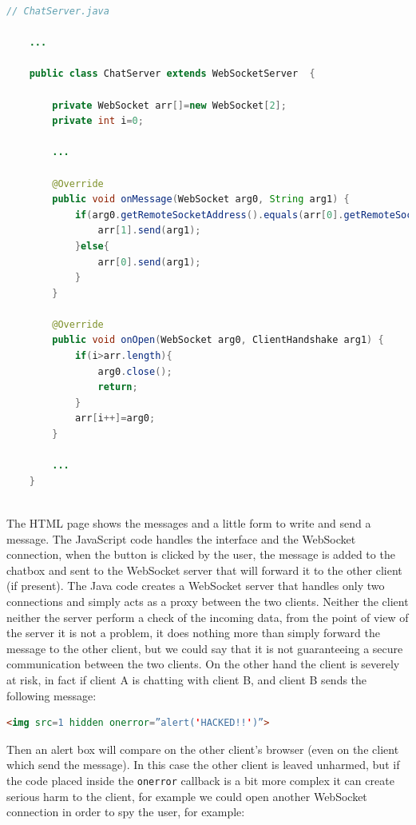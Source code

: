	\begin{lstlisting}[language=Java]
	// ChatServer.java
	
	...
	
	public class ChatServer extends WebSocketServer  {
	
		private WebSocket arr[]=new WebSocket[2];
		private int i=0;
		
		...
		
		@Override
		public void onMessage(WebSocket arg0, String arg1) {
			if(arg0.getRemoteSocketAddress().equals(arr[0].getRemoteSocketAddress())){
				arr[1].send(arg1);
			}else{
				arr[0].send(arg1);
			}
		}
		
		@Override
		public void onOpen(WebSocket arg0, ClientHandshake arg1) {
			if(i>arr.length){
				arg0.close();
				return;
			}
			arr[i++]=arg0;
		}
		
		...
	}
	
	\end{lstlisting}
	
	The HTML page shows the messages and a little form to write and send a message.\newline
	The JavaScript code handles the interface and the WebSocket connection, when the button is clicked by the user, the message is added to the chatbox and sent to the WebSocket server that will forward it to the other client (if present).\newline
	The Java code creates a WebSocket server that handles only two connections and simply acts as a proxy between the two clients.\newline
	Neither the client neither the server perform a check of the incoming data, from the point of view of the server it is not a problem, it does nothing more than simply forward the message to the other client, but we could say that it is not guaranteeing a secure communication between the two clients.\newline
	On the other hand the client is severely at risk, in fact if client A is chatting with client B, and client B sends the following message:\newline
	
	\begin{lstlisting}[language=html]
	<img src=1 hidden onerror=”alert('HACKED!!')”>
	\end{lstlisting}
	
	Then an alert box will compare on the other client’s browser (even on the client which send the message).
	In this case the other client is leaved unharmed, but if the code placed inside the \texttt{onerror} callback is a bit more complex it can create serious harm to the client, for example we could open another WebSocket connection in order to spy the user, for example:
	
